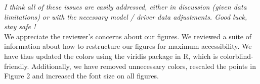 \documentclass[11pt,a4paper]{article}\usepackage[]{graphicx}\usepackage[]{color}
\begin{document}
\textit{I think all of these issues are easily addressed, either in discussion (given data limitations) or with the necessary model / driver data adjustments. Good luck, stay safe !} \\

We appreciate the reviewer's concerns about our figures. We reviewed a suite of information about how to restructure our figures for maximum accessibility. We have thus updated the colors using the viridis package in R, which is colorblind-friendly. Additionally, we have removed unnecessary colors, rescaled the points in Figure 2 and increased the font size on all figures.

\newpage

\end{document}
